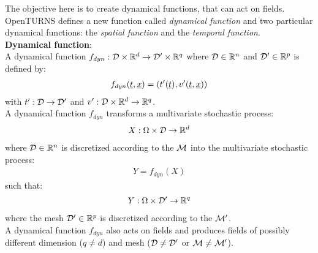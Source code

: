 \renewcommand{\filename}{docUC_LSF_DynamicalFunction.tex}
\renewcommand{\filetitle}{UC : Creation of a Dynamical Function}

\HeaderIIILevel

\label{UCDynamicalFunction}




The objective here is to create dynamical functions, that can act on fields.\\
OpenTURNS defines a new function called {\itshape dynamical function} and two particular dynamical functions: the {\itshape spatial function} and the {\itshape temporal function}.\\

{\bf Dynamical function}:\\
A dynamical function $f_{dyn}:{\mathcal D} \times {\mathbb R}^d \rightarrow {\mathcal D}' \times {\mathbb R}^q$ where ${\mathcal D} \in {\mathbb R}^n$ and  ${\mathcal D}' \in {\mathbb R}^p$ is defined by:
\begin{align}\label{dynFct}
  f_{dyn}({\underline{t}}, {\underline{x}}) = (t'({\underline{t}}), v'({\underline{t}}, {\underline{x}}))
\end{align}
with $t': {\mathcal D} \rightarrow {\mathcal D}'$ and $v': {\mathcal D} \times {\mathbb R}^d \rightarrow {\mathbb R}^q$.\\

A dynamical function $f_{dyn}$ transforms a multivariate stochastic process:
\begin{align}
  X: \Omega \times {\mathcal D} \rightarrow {\mathbb R}^d
\end{align}
where ${\mathcal D} \in {\mathbb R}^n$ is discretized according to the ${\mathcal M}$ into the multivariate stochastic process:
\begin{align}
  Y=f_{dyn}(X)
\end{align}
such that:
\begin{align*}
  Y: \Omega \times {\mathcal D}' \rightarrow {\mathbb R}^q
\end{align*}
where the mesh ${\mathcal D}' \in {\mathbb R}^p$  is discretized according to the ${\mathcal M}'$.\\

A dynamical function $f_{dyn}$ also acts on fields and produces fields of possibly different dimension ($q\neq d$) and mesh (${\mathcal D} \neq {\mathcal D}'$ or ${\mathcal M} \neq {\mathcal M}'$).




